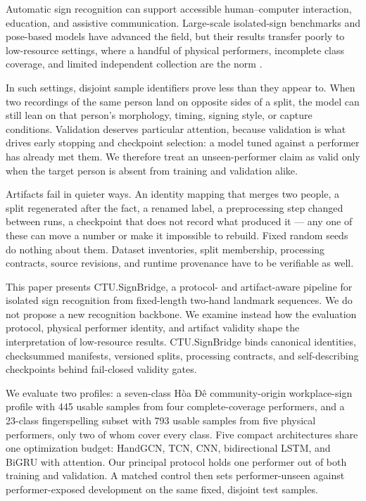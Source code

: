 Automatic sign recognition can support accessible human--computer interaction, education, and assistive communication. Large-scale isolated-sign benchmarks and pose-based models have advanced the field, but their results transfer poorly to low-resource settings, where a handful of physical performers, incomplete class coverage, and limited independent collection are the norm \cite{li_wlasl_2020,selvaraj_openhands_2022,starner_popsign_2023,desai_asl_citizen_2023}.

In such settings, disjoint sample identifiers prove less than they appear to. When two recordings of the same person land on opposite sides of a split, the model can still lean on that person's morphology, timing, signing style, or capture conditions. Validation deserves particular attention, because validation is what drives early stopping and checkpoint selection: a model tuned against a performer has already met them. We therefore treat an unseen-performer claim as valid only when the target person is absent from training and validation alike.

Artifacts fail in quieter ways. An identity mapping that merges two people, a split regenerated after the fact, a renamed label, a preprocessing step changed between runs, a checkpoint that does not record what produced it --- any one of these can move a number or make it impossible to rebuild. Fixed random seeds do nothing about them. Dataset inventories, split membership, processing contracts, source revisions, and runtime provenance have to be verifiable as well.

This paper presents CTU.SignBridge, a protocol- and artifact-aware pipeline for isolated sign recognition from fixed-length two-hand landmark sequences. We do not propose a new recognition backbone. We examine instead how the evaluation protocol, physical performer identity, and artifact validity shape the interpretation of low-resource results. CTU.SignBridge binds canonical identities, checksummed manifests, versioned splits, processing contracts, and self-describing checkpoints behind fail-closed validity gates.

We evaluate two profiles: a seven-class Hòa Đê community-origin workplace-sign profile with 445 usable samples from four complete-coverage performers, and a 23-class fingerspelling subset with 793 usable samples from five physical performers, only two of whom cover every class. Five compact architectures share one optimization budget: HandGCN, TCN, CNN, bidirectional LSTM, and BiGRU with attention. Our principal protocol holds one performer out of both training and validation. A matched control then sets performer-unseen against performer-exposed development on the same fixed, disjoint test samples.


